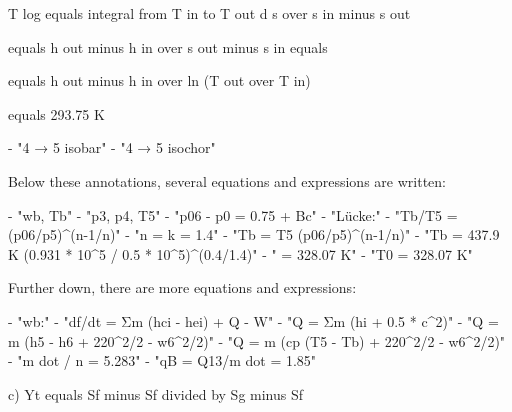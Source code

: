 T log equals integral from T in to T out d s over s in minus s out

equals h out minus h in over s out minus s in equals

equals h out minus h in over ln (T out over T in)

equals 293.75 K

- "4 → 5 isobar"
- "4 → 5 isochor"

Below these annotations, several equations and expressions are written:

- "wb, Tb"
- "p3, p4, T5"
- "p06 - p0 = 0.75 + Bc"
- "Lücke:"
- "Tb/T5 = (p06/p5)^(n-1/n)"
- "n = k = 1.4"
- "Tb = T5 (p06/p5)^(n-1/n)"
- "Tb = 437.9 K (0.931 * 10^5 / 0.5 * 10^5)^(0.4/1.4)"
- " = 328.07 K"
- "T0 = 328.07 K"

Further down, there are more equations and expressions:

- "wb:"
- "df/dt = Σm (hci - hei) + Q - W"
- "Q = Σm (hi + 0.5 * c^2)"
- "Q = m (h5 - h6 + 220^2/2 - w6^2/2)"
- "Q = m (cp (T5 - Tb) + 220^2/2 - w6^2/2)"
- "m dot / n = 5.283"
- "qB = Q13/m dot = 1.85"

c)  
Yt equals Sf minus Sf divided by Sg minus Sf